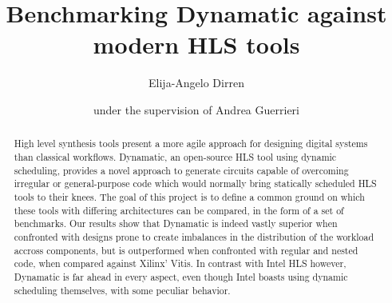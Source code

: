 \documentclass[final,5p,times,twocolumn]{elsarticle}
\begin{document}
\begin{spacing}{1.125}

\begin{frontmatter}


\title{Benchmarking Dynamatic against modern HLS tools}


\author[1]{Elija-Angelo Dirren}
\author[1]{under the supervision of Andrea Guerrieri}

\begin{abstract}
High level synthesis tools present a more agile approach for designing digital systems than classical workflows. Dynamatic, an open-source HLS tool using dynamic scheduling, provides a novel approach to generate circuits capable of overcoming irregular or general-purpose code which would normally bring statically scheduled HLS tools to their knees. The goal of this project is to define a common ground on which these tools with differing architectures can be
compared, in the form of a set of benchmarks. Our results show that Dynamatic is indeed vastly superior when confronted with designs prone to create imbalances in the distribution of the workload accross components, but is outperformed when confronted with regular and nested code, when compared against Xilinx' Vitis. In contrast with Intel HLS however, Dynamatic is far ahead in every aspect, even though Intel boasts using dynamic scheduling themselves, with some peculiar behavior.
\end{abstract}


\end{frontmatter}
\end{spacing}
\end{document}
